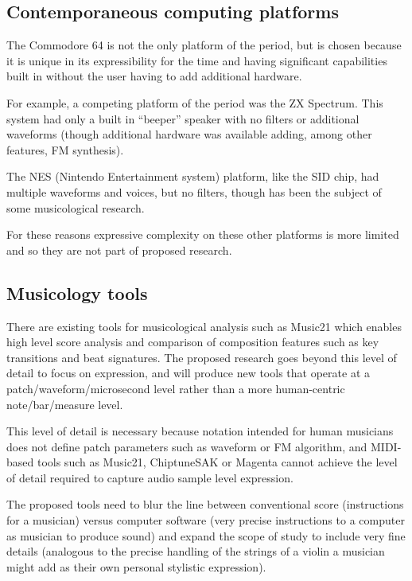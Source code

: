 \documentclass[10pt]{article}
\begin{document}
\begin{multicols*}{2}
\subsection{Contemporaneous computing platforms}

The Commodore 64 is not the only platform of the period, but is chosen because it is unique in its expressibility for the time and having significant capabilities built in without the user having to add additional hardware.

For example, a competing platform of the period was the ZX Spectrum\cite{attrclash}. This system had only a built in “beeper” speaker with no filters or additional waveforms (though additional hardware was available adding, among other features, FM synthesis).

The NES (Nintendo Entertainment system) platform, like the SID chip, had multiple waveforms and voices, but no filters, though has been the subject of some musicological research\cite{nesmusic}.

For these reasons expressive complexity on these other platforms is more limited and so they are not part of proposed research.

\subsection{Musicology tools}

There are existing tools for musicological analysis such as Music21\cite{music21} which enables high level score analysis and comparison of composition features such as key transitions and beat signatures. The proposed research goes beyond this level of detail to focus on expression, and will produce new tools that operate at a patch/waveform/microsecond level rather than a more human-centric note/bar/measure level.

This level of detail is necessary because notation intended for human musicians does not define patch parameters such as waveform or FM algorithm, and MIDI-based tools such as Music21, ChiptuneSAK\cite{ChiptuneSAK} or Magenta\cite{Magenta} cannot achieve the level of detail required to capture audio sample level expression.

The proposed tools need to blur the line between conventional score (instructions for a musician) versus computer software (very precise instructions to a computer as musician to produce sound) and expand the scope of study to include very fine details (analogous to the precise handling of the strings of a violin a musician might add as their own personal stylistic expression).


\end{multicols*}
\end{document}
